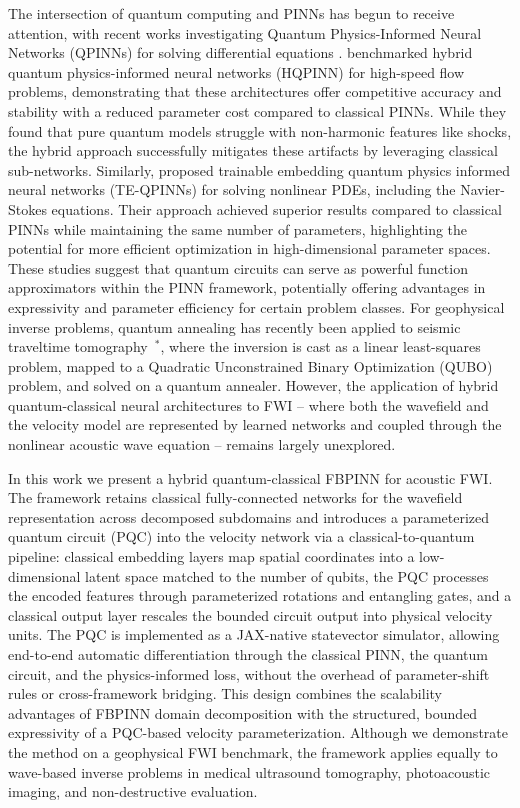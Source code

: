 \documentclass[11pt,a4paper]{article}
\newcommand{\newcite}[1]{\textcolor{todoRed}{$^{\ast}$}\citep{#1}}
\begin{document}
The intersection of quantum computing and PINNs has begun to receive attention, with recent works investigating Quantum Physics-Informed Neural Networks (QPINNs) for solving differential equations \citep{https://doi.org/10.1002/qute.202300065}. \citet{LEONG2025106782} benchmarked hybrid quantum physics-informed neural networks (HQPINN) for high-speed flow problems, demonstrating that these architectures offer competitive accuracy and stability with a reduced parameter cost compared to classical PINNs. While they found that pure quantum models struggle with non-harmonic features like shocks, the hybrid approach successfully mitigates these artifacts by leveraging classical sub-networks. Similarly, \citet{Berger2025} proposed trainable embedding quantum physics informed neural networks (TE-QPINNs) for solving nonlinear PDEs, including the Navier-Stokes equations. Their approach achieved superior results compared to classical PINNs while maintaining the same number of parameters, highlighting the potential for more efficient optimization in high-dimensional parameter spaces. These studies suggest that quantum circuits can serve as powerful function approximators within the PINN framework, potentially offering advantages in expressivity and parameter efficiency for certain problem classes. For geophysical inverse problems, quantum annealing has recently been applied to seismic traveltime tomography~\newcite{Nguyen2025}, where the inversion is cast as a linear least-squares problem, mapped to a Quadratic Unconstrained Binary Optimization (QUBO) problem, and solved on a quantum annealer. However, the application of hybrid quantum-classical neural architectures to FWI -- where both the wavefield and the velocity model are represented by learned networks and coupled through the nonlinear acoustic wave equation -- remains largely unexplored.

In this work we present a hybrid quantum-classical FBPINN for acoustic FWI. The framework retains classical fully-connected networks for the wavefield representation across decomposed subdomains and introduces a parameterized quantum circuit (PQC) into the velocity network via a classical-to-quantum pipeline: classical embedding layers map spatial coordinates into a low-dimensional latent space matched to the number of qubits, the PQC processes the encoded features through parameterized rotations and entangling gates, and a classical output layer rescales the bounded circuit output into physical velocity units. The PQC is implemented as a JAX-native statevector simulator, allowing end-to-end automatic differentiation through the classical PINN, the quantum circuit, and the physics-informed loss, without the overhead of parameter-shift rules or cross-framework bridging. This design combines the scalability advantages of FBPINN domain decomposition with the structured, bounded expressivity of a PQC-based velocity parameterization. Although we demonstrate the method on a geophysical FWI benchmark, the framework applies equally to wave-based inverse problems in medical ultrasound tomography, photoacoustic imaging, and non-destructive evaluation.
\end{document}
